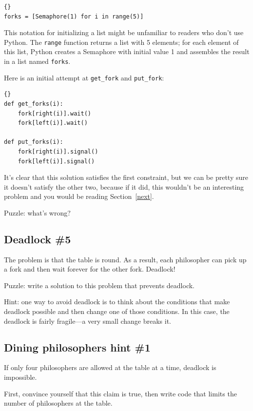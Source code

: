 \documentclass{book}
\newcommand{\clearemptydoublepage}{\newpage\cleardoublepage}
\begin{document}
\begin{lstlisting}[title={Variables for dining philosophers}]{}
forks = [Semaphore(1) for i in range(5)]
\end{lstlisting}

This notation for initializing a list might be unfamiliar to
readers who don't use Python.  The {\tt range} function returns
a list with 5 elements; for each element of this list, Python
creates a Semaphore with initial value 1 and assembles the
result in a list named {\tt forks}.

Here is an initial attempt at {\tt get\_fork} and {\tt put\_fork}:

\begin{lstlisting}[title={Dining philosophers non-solution}]{}
def get_forks(i):
    fork[right(i)].wait()
    fork[left(i)].wait()

def put_forks(i):
    fork[right(i)].signal()
    fork[left(i)].signal()
\end{lstlisting}

It's clear that this solution satisfies the first constraint, but
we can be pretty sure it doesn't satisfy the other two, because
if it did, this wouldn't be an interesting problem and you would
be reading Section~\ref{next}.

Puzzle: what's wrong?


\clearemptydoublepage
\subsection{Deadlock \#5}

The problem is that the table is round.  As a result, each philosopher
can pick up a fork and then wait forever for the other fork.  Deadlock!

Puzzle: write a solution to this problem that prevents deadlock.

Hint: one way to avoid deadlock is to think about the conditions
that make deadlock possible and then change one of those conditions.
In this case, the deadlock is fairly fragile---a very small change
breaks it.

\clearemptydoublepage
\subsection{Dining philosophers hint \#1}

If only four philosophers are allowed at the table at a time,
deadlock is impossible.

First, convince yourself that this claim is true, then write code that
limits the number of philosophers at the table.
\end{document}
